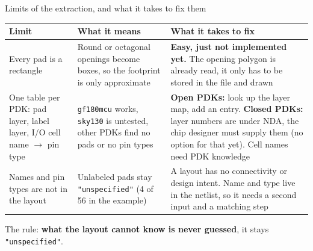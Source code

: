 \documentclass[aspectratio=169,11pt]{beamer}
\newcommand{\hl}[1]{{\color{cobgold}\textbf{#1}}}
\begin{document}
\begin{frame}{Limits of the extraction, and what it takes to fix them}
  \footnotesize
  \renewcommand{\arraystretch}{1.0}
  \begin{tabular}{@{}L{2.9cm}L{3.9cm}L{5.2cm}@{}}
    \toprule
    \textbf{Limit} & \textbf{What it means} & \textbf{What it takes to fix}\\
    \midrule
    Every pad is a rectangle
      & Round or octagonal openings become boxes, so the footprint is only approximate
      & \hl{Easy, just not implemented yet.} The opening polygon is already read, it only has to be stored in the file and drawn\\
    \addlinespace[0.3em]
    One table per PDK: pad layer, label layer, I/O cell name $\to$ pin type
      & \texttt{gf180mcu} works, \texttt{sky130} is untested, other PDKs find no pads or no pin types
      & \textbf{Open PDKs:} look up the layer map, add an entry. \textbf{Closed PDKs:} layer numbers are under NDA, the chip designer must supply them (no option for that yet). Cell names need PDK knowledge\\
    \addlinespace[0.3em]
    Names and pin types are not in the layout
      & Unlabeled pads stay \texttt{"unspecified"} (4 of 56 in the example)
      & A layout has no connectivity or design intent. Name and type live in the netlist, so it needs a second input and a matching step\\
    \bottomrule
  \end{tabular}
  \vspace{0.1em}
  \begin{center}\footnotesize
    The rule: \hl{what the layout cannot know is never guessed}, it stays \texttt{"unspecified"}.
  \end{center}
\end{frame}
\end{document}
